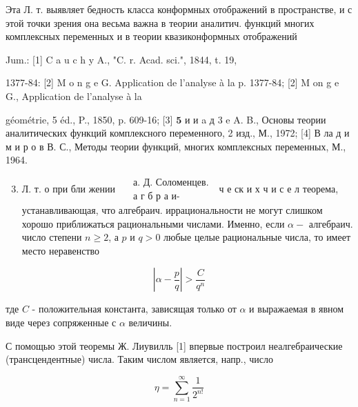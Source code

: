 \documentclass[10pt]{article}
\begin{document}
Эта Л. т. выявляет бедность класса конформных отображений в пространстве, и с этой точки зрения она весьма важна в теории аналитич. функций многих комплексных переменных и в теории квазиконформных отображений



Jum.: [1] C a u c h y A., "C. r. Acad. sci.", 1844, t. 19,

1377-84: [2] M o n g e G. Application de l'analyse à la p. 1377-84; [2] M on g e G., Application de l'analyse à la

géométrie, 5 éd., P., 1850, p. 609-16; [3] $\mathbf{5}$ и и a д 3 e A. B., Основы теории аналитических функций комплексного переменного, 2 изд., М., 1972; [4] В ла д и м и р о в В. С., Методы теории функций, многих комплексных переменных, М., 1964.



\begin{enumerate}

  \setcounter{enumi}{2}

  \item Л. т. о при бли жении $\begin{aligned} & \text { а. Д. Соломенцев. } \\ & \text { а г б р а и- }\end{aligned}$ ч е ск и х ч и с е л теорема, устанавливающая, что алгебраич. иррациональности не могут слишком хорошо приближаться рациональными числами. Именно, если $\alpha-$ алгебраич. число степени $n \geqslant 2$, а $p$ и $q>0$ любые целые рациональные числа, то имеет место неравенство

\end{enumerate}



\[

\left|\alpha-\frac{p}{q}\right|>\frac{C}{q^{n}}

\]



тде $C$ - положительная константа, зависящая только от $\alpha$ и выражаемая в явном виде через сопряженные с $\alpha$ величины.



С помощью этой теоремы Ж. Лиувилль [1] впервые построил неалгебраические (трансцендентные) числа. Таким числом является, напр., число



\[

\eta=\sum_{n=1}^{\infty} \frac{1}{2^{n !}}

\]
\end{document}
